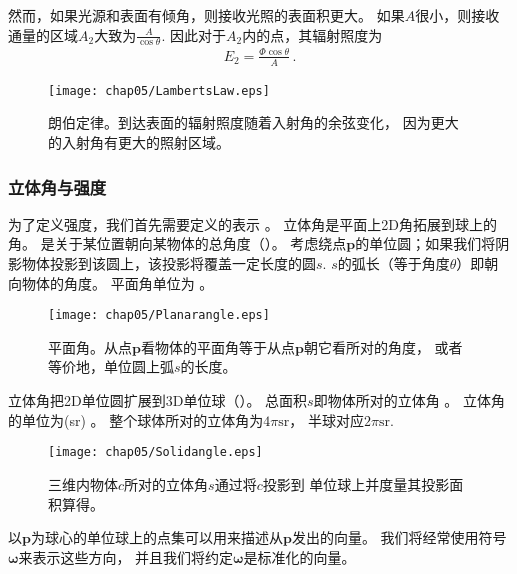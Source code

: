 然而，如果光源和表面有倾角，则接收光照的表面积更大。
如果$A$很小，则接收通量的区域$A_2$大致为$\displaystyle\frac{A}{\cos\theta}$.
因此对于$A_2$内的点，其辐射照度为
\begin{align*}
    E_2=\frac{\varPhi\cos\theta}{A}\, .
\end{align*}

\begin{figure}[htbp]
    \centering\texttt{[image: chap05/LambertsLaw.eps]}
    \caption{朗伯定律。到达表面的辐射照度随着入射角的余弦变化，
        因为更大的入射角有更大的照射区域。}
    \label{fig:5.7}
\end{figure}

\subsubsection*{立体角与强度}
为了定义强度，我们首先需要定义的表示
。
立体角是平面上2D角拓展到球上的角。
是关于某位置朝向某物体的总角度（）。
考虑绕点$\bm p$的单位圆；如果我们将阴影物体投影到该圆上，该投影将覆盖一定长度的圆$s$.
$s$的弧长（等于角度$\theta$）即朝向物体的角度。
平面角单位为
。
\begin{figure}[htbp]
    \centering\texttt{[image: chap05/Planarangle.eps]}
    \caption{平面角。从点$\bm p$看物体的平面角等于从点$\bm p$朝它看所对的角度，
        或者等价地，单位圆上弧$s$的长度。}
    \label{fig:5.8}
\end{figure}

立体角把2D单位圆扩展到3D单位球（）。
总面积$s$即物体所对的立体角
。
立体角的单位为(sr)
。
整个球体所对的立体角为$4\pi \text{sr}$，
半球对应$2\pi \text{sr}$.
\begin{figure}[htbp]
    \centering\texttt{[image: chap05/Solidangle.eps]}
    \caption{三维内物体$c$所对的立体角$s$通过将$c$投影到
        单位球上并度量其投影面积算得。}
    \label{fig:5.9}
\end{figure}

以$\bm p$为球心的单位球上的点集可以用来描述从$\bm p$发出的向量。
我们将经常使用符号$\bm\omega$来表示这些方向，
并且我们将约定$\bm\omega$是标准化的向量。

